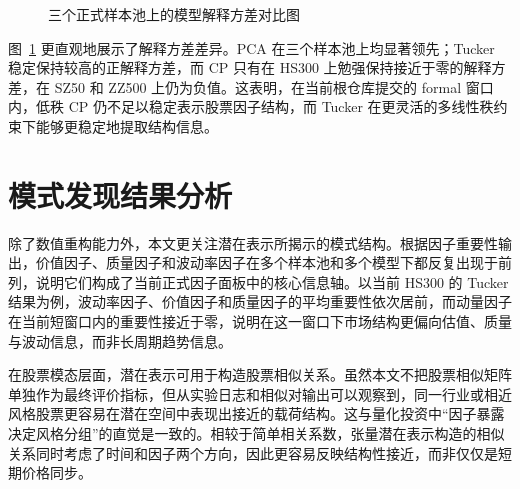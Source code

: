 \begin{figure}[!t]
\centering
{}
\caption{三个正式样本池上的模型解释方差对比图}
\label{fig:variance}
\end{figure}

图~\ref{fig:variance} 更直观地展示了解释方差差异。PCA 在三个样本池上均显著领先；Tucker 稳定保持较高的正解释方差，而 CP 只有在 HS300 上勉强保持接近于零的解释方差，在 SZ50 和 ZZ500 上仍为负值。这表明，在当前根仓库提交的 formal 窗口内，低秩 CP 仍不足以稳定表示股票因子结构，而 Tucker 在更灵活的多线性秩约束下能够更稳定地提取结构信息。

\section{模式发现结果分析}

除了数值重构能力外，本文更关注潜在表示所揭示的模式结构。根据因子重要性输出，价值因子、质量因子和波动率因子在多个样本池和多个模型下都反复出现于前列，说明它们构成了当前正式因子面板中的核心信息轴。以当前 HS300 的 Tucker 结果为例，波动率因子、价值因子和质量因子的平均重要性依次居前，而动量因子在当前短窗口内的重要性接近于零，说明在这一窗口下市场结构更偏向估值、质量与波动信息，而非长周期趋势信息。

在股票模态层面，潜在表示可用于构造股票相似关系。虽然本文不把股票相似矩阵单独作为最终评价指标，但从实验日志和相似对输出可以观察到，同一行业或相近风格股票更容易在潜在空间中表现出接近的载荷结构。这与量化投资中“因子暴露决定风格分组”的直觉是一致的。相较于简单相关系数，张量潜在表示构造的相似关系同时考虑了时间和因子两个方向，因此更容易反映结构性接近，而非仅仅是短期价格同步。

